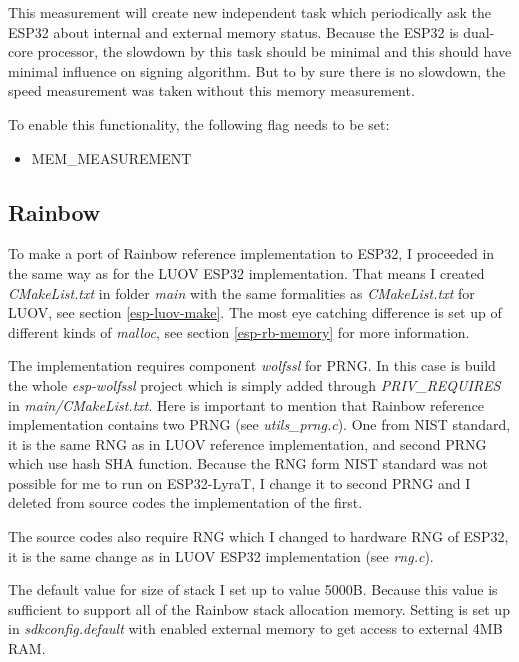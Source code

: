 \documentclass[thesis=M,english]{FITthesis}[2019/12/23]
\begin{document}
\bigskip
\noindent
This measurement will create new independent task which periodically ask the ESP32 about internal and external memory status. Because the ESP32 is dual-core processor, the slowdown by this task should be minimal and this should have minimal influence on signing algorithm. But to by sure there is no slowdown, the speed measurement was taken without this memory measurement.

\bigskip
\noindent
To enable this functionality, the following flag needs to be set:
\begin{itemize}
\item	MEM\_MEASUREMENT
\end{itemize}

\subsection{Rainbow}
To make a port of Rainbow reference implementation to ESP32, I proceeded in the same way as for the LUOV ESP32 implementation. That means I created \textit{CMakeList.txt} in folder \textit{main} with the same formalities as \textit{CMakeList.txt} for LUOV, see section \ref{esp-luov-make}. The most eye catching difference is set up of different kinds of \textit{malloc}, see section \ref{esp-rb-memory} for more information.

\bigskip
\noindent
The implementation requires component \textit{wolfssl} for PRNG. In this case is build the whole \textit{esp-wolfssl} project which is simply added through \textit{PRIV\_REQUIRES} in \textit{main/CMakeList.txt}. Here is important to mention that Rainbow reference implementation contains two PRNG (see \textit{utils\_prng.c}). One from NIST standard, it is the same RNG as in LUOV reference implementation, and second PRNG which use hash SHA function. Because the RNG form NIST standard was not possible for me to run on ESP32-LyraT, I change it to second PRNG and  I deleted from source codes the implementation of the first.

\bigskip
\noindent
The source codes also require RNG which I changed to hardware RNG of ESP32, it is the same change as in LUOV ESP32 implementation (see \textit{rng.c}).

\bigskip
\noindent
The default value for size of stack I set up to value 5000B. Because this value is sufficient to support all of the Rainbow stack allocation memory. Setting is set up in \textit{sdkconfig.default} with enabled external memory to get access to external 4MB RAM.
\end{document}
